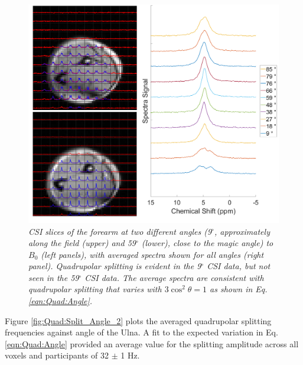\begin{figure}
    \centering
    \includegraphics[width=1\textwidth]{Figures/Quad/Arm_CSI_Angle.png}
    \caption{\textit{\ac{CSI} slices of the forearm at two different angles (9$^\circ$, approximately along the field (upper) and 59$^\circ$ (lower), close to the magic angle) to $B_0$ (left panels), with averaged spectra shown for all angles (right panel). Quadrupolar splitting is evident in the 9$^\circ$ \ac{CSI} data, but not seen in the 59$^\circ$ \ac{CSI} data. The average spectra are consistent with quadrupolar splitting that varies with $3\cos^2\theta = 1$ as shown in Eq. \ref{eqn:Quad:Angle}.}}
    \label{fig:Quad:Arm_CSI}
\end{figure}

 Figure \ref{fig:Quad:Split_Angle_2} plots the averaged quadrupolar splitting frequencies against angle of the Ulna. A fit to the expected variation in Eq. \ref{eqn:Quad:Angle} provided an average value for the splitting amplitude across all voxels and participants of 32 $\pm$ 1 Hz. 

